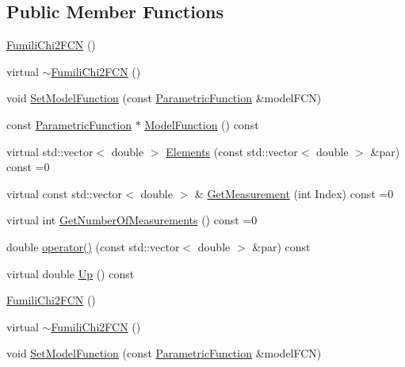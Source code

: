 \subsection*{Public Member Functions}
\begin{DoxyCompactItemize}
\item 
\mbox{\hyperlink{classROOT_1_1Minuit2_1_1FumiliChi2FCN_ae0918088996b787c67bdbe0b79b134cb}{Fumili\+Chi2\+F\+CN}} ()
\item 
virtual \mbox{\hyperlink{classROOT_1_1Minuit2_1_1FumiliChi2FCN_a50ee230fc1f0a93c6b9491a031f19b94}{$\sim$\+Fumili\+Chi2\+F\+CN}} ()
\item 
void \mbox{\hyperlink{classROOT_1_1Minuit2_1_1FumiliChi2FCN_a0db1c6dd4cbdc96107490f572cce20da}{Set\+Model\+Function}} (const \mbox{\hyperlink{classROOT_1_1Minuit2_1_1ParametricFunction}{Parametric\+Function}} \&model\+F\+CN)
\item 
const \mbox{\hyperlink{classROOT_1_1Minuit2_1_1ParametricFunction}{Parametric\+Function}} $\ast$ \mbox{\hyperlink{classROOT_1_1Minuit2_1_1FumiliChi2FCN_a3d31739e476a413e0c5616bb0c6283b9}{Model\+Function}} () const
\item 
virtual std\+::vector$<$ double $>$ \mbox{\hyperlink{classROOT_1_1Minuit2_1_1FumiliChi2FCN_a25cc8dcc2eff831b3c0a94bf5413c2cd}{Elements}} (const std\+::vector$<$ double $>$ \&par) const =0
\item 
virtual const std\+::vector$<$ double $>$ \& \mbox{\hyperlink{classROOT_1_1Minuit2_1_1FumiliChi2FCN_a1831875c53596cd4aa52ea536de53b60}{Get\+Measurement}} (int Index) const =0
\item 
virtual int \mbox{\hyperlink{classROOT_1_1Minuit2_1_1FumiliChi2FCN_afa1acb8484d1c1825de0dd641e301717}{Get\+Number\+Of\+Measurements}} () const =0
\item 
double \mbox{\hyperlink{classROOT_1_1Minuit2_1_1FumiliChi2FCN_ae7b2c2080162c0b946cf54090b712716}{operator()}} (const std\+::vector$<$ double $>$ \&par) const
\item 
virtual double \mbox{\hyperlink{classROOT_1_1Minuit2_1_1FumiliChi2FCN_a7e68bc2b2eb631ec52b753d7d49c4414}{Up}} () const
\item 
\mbox{\hyperlink{classROOT_1_1Minuit2_1_1FumiliChi2FCN_ae0918088996b787c67bdbe0b79b134cb}{Fumili\+Chi2\+F\+CN}} ()
\item 
virtual \mbox{\hyperlink{classROOT_1_1Minuit2_1_1FumiliChi2FCN_a50ee230fc1f0a93c6b9491a031f19b94}{$\sim$\+Fumili\+Chi2\+F\+CN}} ()
\item 
void \mbox{\hyperlink{classROOT_1_1Minuit2_1_1FumiliChi2FCN_a0db1c6dd4cbdc96107490f572cce20da}{Set\+Model\+Function}} (const \mbox{\hyperlink{classROOT_1_1Minuit2_1_1ParametricFunction}{Parametric\+Function}} \&model\+F\+CN)

\end{DoxyCompactItemize}
